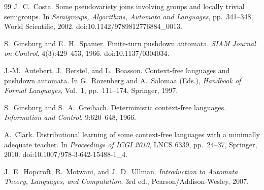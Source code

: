 \documentclass[11pt,a4paper]{article}
\theoremstyle{remark}
\theoremstyle{plain}
\begin{document}
\begin{thebibliography}{99}
J.~C.~Costa.
\newblock Some pseudovariety joins involving groups and locally trivial semigroups.
\newblock In \textit{Semigroups, Algorithms, Automata and Languages},
pp.~341--348, World Scientific, 2002.
\newblock doi:10.1142/9789812776884\_0013.

S.~Ginsburg and E.~H.~Spanier.
\newblock Finite-turn pushdown automata.
\newblock \textit{SIAM Journal on Control}, 4(3):429--453, 1966.
doi:10.1137/0304034.

J.-M.~Autebert, J.~Berstel, and L.~Boasson.
\newblock Context-free languages and pushdown automata.
\newblock In G.~Rozenberg and A.~Salomaa (Eds.),
\emph{Handbook of Formal Languages}, Vol.~1, pp.~111--174,
Springer, 1997.

S.~Ginsburg and S.~A.~Greibach.
\newblock Deterministic context-free languages.
\newblock \emph{Information and Control}, 9:620--648, 1966.

A.~Clark.
\newblock Distributional learning of some context-free languages with a
minimally adequate teacher.
\newblock In \emph{Proceedings of ICGI 2010}, LNCS 6339, pp.~24--37,
Springer, 2010.
doi:10.1007/978-3-642-15488-1\_4.

J.~E.~Hopcroft, R.~Motwani, and J.~D.~Ullman.
\newblock \emph{Introduction to Automata Theory, Languages, and Computation}.
\newblock 3rd ed., Pearson/Addison-Wesley, 2007.

\end{thebibliography}
\end{document}

